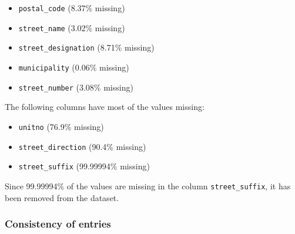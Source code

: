 \documentclass[11pt]{article}
\begin{document}
    \begin{itemize}
        \item \texttt{postal\_code} (8.37\% missing)
        \item \texttt{street\_name} (3.02\% missing)
        \item \texttt{street\_designation} (8.71\% missing)
        \item \texttt{municipality} (0.06\% missing)
        \item \texttt{street\_number} (3.08\% missing)
    \end{itemize}

    \vspace{5mm}

    The following columns have most of the values missing:

    \begin{itemize}
        \item \texttt{unitno} (76.9\% missing)
        \item \texttt{street\_direction} (90.4\% missing)
        \item \texttt{street\_suffix} (99.99994\% missing)
    \end{itemize}

    Since 99.99994\% of the values are missing in the column \texttt{street\_suffix}, it has been removed from the dataset.

    \subsubsection{Consistency of entries} \label{subsubsec:teranet_consistency}
\end{document}
